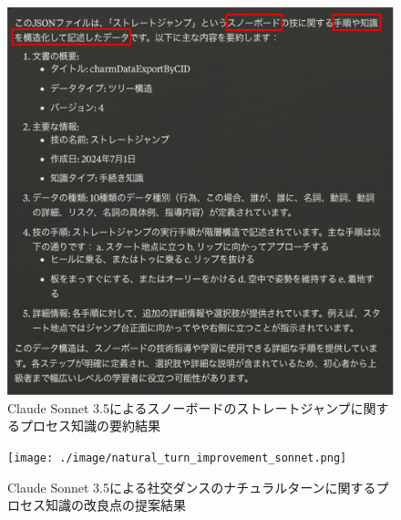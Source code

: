 \begin{figure}[htbp]
    \centering
    \includegraphics[width=1.0\linewidth]{./image/straight_jump_summarize_sonnet.png}
    \caption{Claude Sonnet 3.5によるスノーボードのストレートジャンプに関するプロセス知識の要約結果}
    \label{fig10}
\end{figure}
\begin{figure}[htbp]
    \centering
    \texttt{[image: ./image/natural\_turn\_improvement\_sonnet.png]}
    \caption{Claude Sonnet 3.5による社交ダンスのナチュラルターンに関するプロセス知識の改良点の提案結果}
    \label{fig11}
\end{figure}

